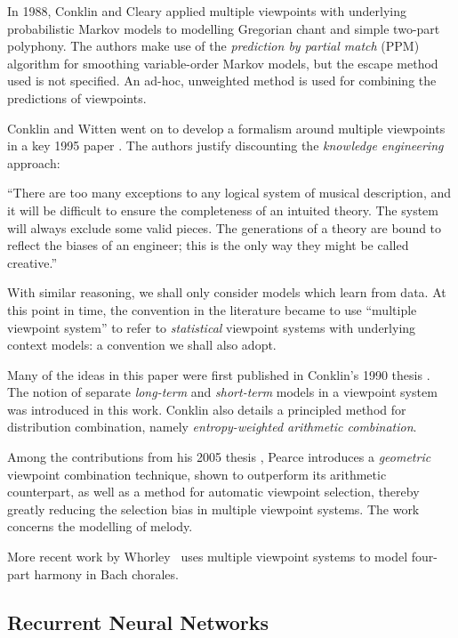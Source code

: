 \documentclass[12pt,a4paper,twoside,openright]{report}
\begin{document}
In 1988, Conklin and Cleary \cite{conklin1988modelling} applied multiple
viewpoints with underlying probabilistic Markov models to modelling Gregorian
chant and simple two-part polyphony. The authors make use of the
\emph{prediction by partial match} (PPM) algorithm \cite{cleary1984ppm} for
smoothing variable-order Markov models, but the escape method used is not
specified.  An ad-hoc, unweighted method is used for combining the predictions
of viewpoints.

Conklin and Witten went on to develop a formalism around multiple viewpoints in
a key 1995 paper \cite{conklin1995viewpoints}. The authors justify discounting
the
\emph{knowledge engineering} approach:

\begin{displayquote}
``There are too many exceptions to any
logical system of musical description, and it will be difficult to ensure the
completeness of an intuited theory. The system will always exclude some valid
pieces. The generations of a theory are bound to reflect the biases of an
engineer; this is the only way they might be called creative.''
\end{displayquote}

With similar reasoning, we shall only consider models which learn from data.  At
this point in time, the convention in the literature became to use ``multiple
viewpoint system'' to refer to \emph{statistical} viewpoint systems with
underlying context models: a convention we shall also adopt.

Many of the ideas in this paper were first published in Conklin's 1990 thesis
\cite{conklin1990prediction}. The notion of separate \emph{long-term} and
\emph{short-term} models in a viewpoint system was introduced in this work.
Conklin also details a principled method for distribution combination, namely
\emph{entropy-weighted arithmetic combination}. 

Among the contributions from his 2005 thesis \cite{pearce2005construction},
Pearce introduces a \emph{geometric} viewpoint combination technique, shown to
outperform its arithmetic counterpart, as well as a method for automatic
viewpoint selection, thereby greatly reducing the selection bias in multiple
viewpoint systems. The work concerns the modelling of melody.

More recent work by Whorley~\cite{whorley2013phd} uses multiple viewpoint
systems to model four-part harmony in Bach chorales.

\subsection{Recurrent Neural Networks}
\end{document}
